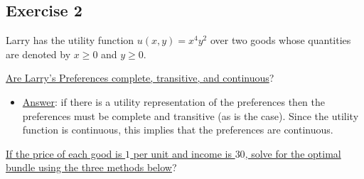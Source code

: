 \documentclass{article}
\begin{document}
\subsection{Exercise 2}
Larry has the utility function $u(x,y)=x^{4}y^{2}$ over two goods whose quantities are denoted by $x \geq 0$ and $y \geq 0$. \par \vspace{0.3em}
  \underline{Are Larry's Preferences complete, transitive, and continuous}?
  \begin{itemize}
    \item  \underline{Answer}: if there is a utility representation of the preferences then the preferences must be complete and transitive (as is the case). Since the utility function is continuous, this implies that the preferences are continuous.
  \end{itemize}
  \par
  \underline{If the price of each good is $1$ per unit and income is $30$, solve for the optimal bundle using the three methods below}?
\end{document}

